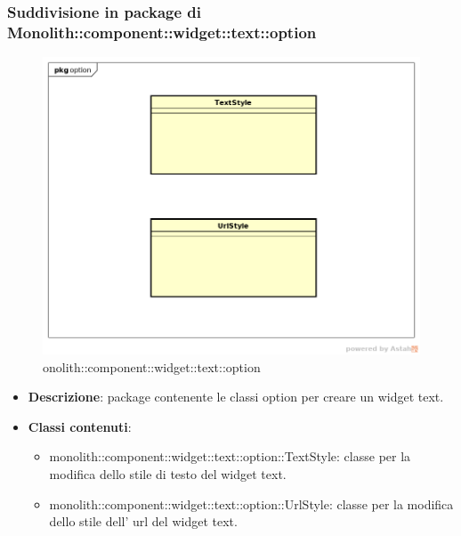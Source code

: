 \subsubsection{Suddivisione in package  di Monolith::component::widget::text::option}
\label{monolith::component::widget::text::option}
\begin{figure}[H]
	\centering
	\includegraphics[scale=0.5]{Sezioni/imgPackage/component_widget_text_option.png}
	\caption{onolith::component::widget::text::option}
\end{figure}
\begin{itemize}
	\item{\textbf{Descrizione}}: package contenente le classi option per creare un widget text.
	\item{\textbf{Classi contenuti}}:
	\begin{itemize}
	\item{monolith::component::widget::text::option::TextStyle}: classe per la modifica dello stile di testo del widget text.
	\item{monolith::component::widget::text::option::UrlStyle}: classe per la modifica dello stile dell' url del widget text.
	\end{itemize}
\end{itemize}







\newpage